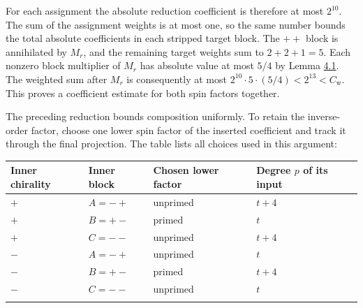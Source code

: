 \documentclass[
  english,
  11pt,
  reqno]{amsart}
\begin{document}
For each assignment the absolute reduction coefficient is therefore at
most \(2^{10}\). The sum of the assignment weights is at most one, so
the same number bounds the total absolute coefficients in each stripped
target block. The \(++\) block is annihilated by \(M_r\), and the
remaining target weights sum to \(2+2+1=5\). Each nonzero block
multiplier of \(M_r\) has absolute value at most \(5/4\) by Lemma
\hyperref[lem:es-spencer]{4.1}. The weighted sum after \(M_r\) is
consequently at most \(2^{10}\cdot5\cdot(5/4)<2^{13}<C_{\mathrm w}\).
This proves a coefficient estimate for both spin factors together.

The preceding reduction bounds composition uniformly. To retain the
inverse-order factor, choose one lower spin factor of the inserted
coefficient and track it through the final projection. The table lists
all choices used in this argument:

\begin{center}
\begin{tabular}{@{}
  >{\raggedright\arraybackslash}p{}
  >{\raggedright\arraybackslash}p{}
  >{\raggedright\arraybackslash}p{}
  >{\raggedright\arraybackslash}p{}@{}}
\toprule\noalign{}
\begin{minipage}[b]{\linewidth}\raggedright
Inner chirality
\end{minipage} & \begin{minipage}[b]{\linewidth}\raggedright
Inner block
\end{minipage} & \begin{minipage}[b]{\linewidth}\raggedright
Chosen lower factor
\end{minipage} & \begin{minipage}[b]{\linewidth}\raggedright
Degree \(p\) of its input
\end{minipage} \\
\midrule\noalign{}
\(+\) & \(A=-+\) & unprimed & \(t+4\) \\
\(+\) & \(B=+-\) & primed & \(t\) \\
\(+\) & \(C=--\) & unprimed & \(t+4\) \\
\(-\) & \(A=-+\) & unprimed & \(t\) \\
\(-\) & \(B=+-\) & primed & \(t+4\) \\
\(-\) & \(C=--\) & unprimed & \(t\) \\
\bottomrule\noalign{}
\end{tabular}
\end{center}
\end{document}

